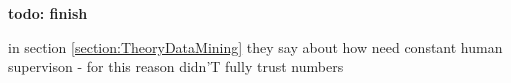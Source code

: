 %
%
%






















\textbf{todo: finish}

in section \ref{section:TheoryDataMining} they say about how need constant human supervison - for this reason didn'T fully trust numbers